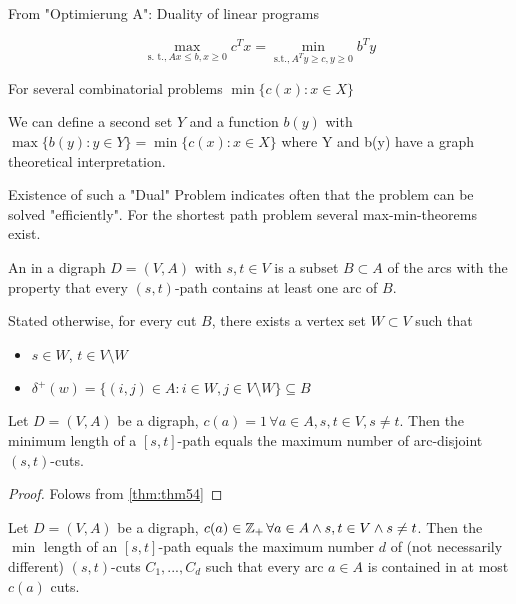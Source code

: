 From "Optimierung A": Duality of linear programs

\[\max_{\text{s. t.}, Ax \leq b, x \geq 0} c^Tx = \min_{\text{s.t.}, A^T y \geq c, y \geq 0} b^T y\]

For several combinatorial problems $\min\{c(x): x \in X\}$

We can define a second set $Y$ and a function $b(y)$ with $\max\{b(y): y \in Y \} = \min \{ c(x): x \in X\}$ where Y and b(y) have a graph theoretical interpretation. 

Existence of such a "Dual" Problem indicates often that the problem can be solved "efficiently". For the shortest path problem several max-min-theorems exist.

\begin{defn}
An  in a digraph $D=(V,A)$ with $s,t \in V$ is a subset $B \subset A$ of the arcs with the property that every $(s,t)$-path contains at least one arc of $B$.

Stated  otherwise, for every cut $B$, there exists a vertex set $W \subset V$ such that
\begin{itemize}
	\item $s \in W$, $t \in V \setminus W$
	\item $\delta^+(w) = \{(i,j) \in A: i \in W, j \in V \setminus W\} \subseteq B$
\end{itemize}
\end{defn}

\begin{thm}
	Let $D=(V,A)$ be a digraph, $c(a)=1 \, \forall a \in A, s,t \in V, s \neq t$. Then the minimum length of a $[s,t]$-path equals the maximum number of arc-disjoint $(s,t)$-cuts. 
\end{thm}

\begin{proof}
	Folows from \ref{thm:thm54} %
\end{proof}

\begin{thm}\label{thm:thm54} %
	Let $D=(V,A)$ be a digraph, $c(a) \in \mathbb{Z}_+ \, \forall a \in A \wedge s,t \in V \wedge s\neq t$. Then the $\min$ length of an $[s,t]$-path equals the maximum number $d$ of (not necessarily different) $(s,t)$-cuts $C_1, ..., C_d$ such that every arc $a \in A$ is contained in at most $c(a)$ cuts.
\end{thm}

